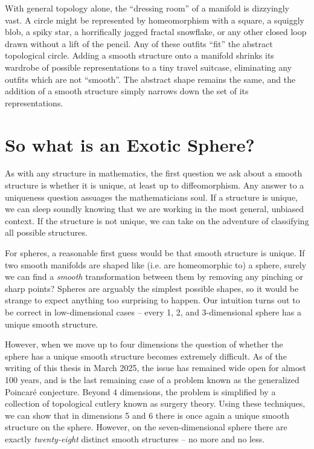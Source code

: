 With general topology alone, the ``dressing room'' of a manifold is dizzyingly vast.
A circle might be represented by homeomorphism with a square, a squiggly blob, a spiky star, a horrifically jagged fractal snowflake, or any other closed loop drawn without a lift of the pencil. Any of these outfits ``fit'' the abstract topological circle.
Adding a smooth structure onto a manifold shrinks its wardrobe of possible representations to a tiny travel suitcase, eliminating any outfits which are not ``smooth''. The abstract shape remains the same, and the addition of a smooth structure simply narrows down the set of its representations.

\section*{So what is an Exotic Sphere?}

As with any structure in mathematics, the first question we ask about a smooth structure is whether it is unique, at least up to diffeomorphism. Any answer to a uniqueness question assuages the mathematicians soul. If a structure is unique, we can sleep soundly knowing that we are working in the most general, unbiased context. If the structure is not unique, we can take on the adventure of classifying all possible structures.

For spheres, a reasonable first guess would be that smooth structure is unique. If two smooth manifolds are shaped like (i.e. are homeomorphic to) a sphere, surely we can find a \emph{smooth} transformation between them by removing any pinching or sharp points? Spheres are arguably the simplest possible shapes, so it would be strange to expect anything too surprising to happen. Our intuition turns out to be correct in low-dimensional cases -- every 1, 2, and 3-dimensional sphere has a unique smooth structure. 

However, when we move up to four dimensions the question of whether the sphere has a unique smooth structure becomes extremely difficult. As of the writing of this thesis in March 2025, the issue has remained wide open for almost 100 years, and is the last remaining case of a problem known as the generalized Poincar\'e conjecture. Beyond $4$ dimensions, the problem is simplified by a collection of topological cutlery known as surgery theory.
Using these techniques, we can show that in dimensions 5 and 6 there is once again a unique smooth structure on the sphere. However, on the seven-dimensional sphere there are exactly \emph{twenty-eight} distinct smooth structures -- no more and no less. 

